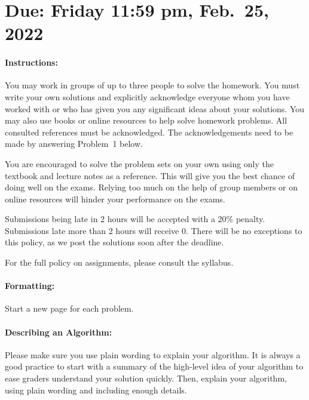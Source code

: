\documentclass[11pt]{article}
\begin{document}
\maketitle

\section*{Due: Friday 11:59 pm, Feb.\ 25, 2022}

\paragraph*{Instructions:}

You may work in groups of up to three people to solve the homework.
You must write your own solutions and explicitly acknowledge everyone whom 
you have worked with or who has given you any significant ideas about your solutions. 
You may also use books or online resources to help solve homework problems.  
All consulted references must be acknowledged. The acknowledgements need to be made by answering Problem~1 below.

You are encouraged to solve the problem sets on your own using only the textbook and lecture notes as a reference. This will give you the best chance of doing well on the exams. Relying too much on the help of group members or on online resources will hinder your performance on the exams.

Submissions being late in 2 hours will be accepted with a 20\% penalty. Submissions late more than 2 hours will receive 0. There will be no exceptions to this policy, as we post the solutions soon after the deadline. 

For the full policy on assignments, please consult the syllabus.

\paragraph*{Formatting:} Start a new page for each problem.

\paragraph*{Describing an Algorithm:} Please make sure you use plain wording to explain your algorithm. It is always a good practice to start with a summary of the high-level idea of your algorithm to ease graders understand your solution quickly. Then, explain your algorithm, using plain wording and including enough details.
\end{document}
